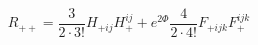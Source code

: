 \begin{equation}
R_{++} = \frac{3}{2 \cdot 3!} H_{+ij} H_+^{ij} +
 e^{2 \Phi} \frac{4}{2 \cdot 4!} F_{+ijk} F_+^{ijk}
\end{equation}

